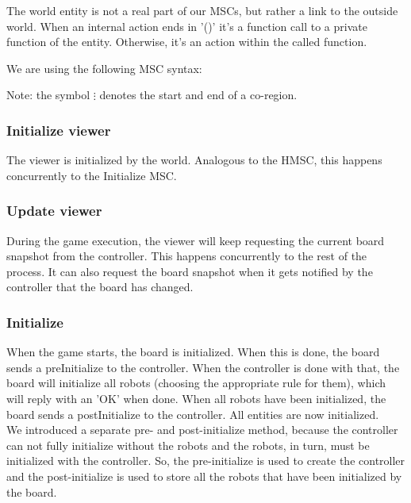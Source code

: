 	The world entity is not a real part of our MSCs, but rather a link to the outside world. When an internal action ends in '()' it's a function call to a private function of the entity. Otherwise, it's an action within the called function.

	We are using the following MSC syntax:

	

	Note: the symbol $\vdots$ denotes the start and end of a co-region.

	\subsubsection{Initialize viewer}
	The viewer is initialized by the world. Analogous to the HMSC, this happens concurrently to the Initialize MSC.
	
	

    	\subsubsection{Update viewer}
	During the game execution, the viewer will keep requesting the current board snapshot from the controller. This happens concurrently to the rest of the process. It can also request the board snapshot when it gets notified by the controller that the board has changed.
    	
	

	\subsubsection{Initialize}
	When the game starts, the board is initialized. When this is done, the board sends a preInitialize to the controller. When the controller is done with that, the board will initialize all robots (choosing the appropriate rule for them), which will reply with an 'OK' when done. When all robots have been initialized, the board sends a postInitialize to the controller. All entities are now initialized. \\
	We introduced a separate pre- and post-initialize method, because the controller can not fully initialize without the robots and the robots, in turn, must be initialized with the controller. So, the pre-initialize is used to create the controller and the post-initialize is used to store all the robots that have been initialized by the board.
  	
	
    	
